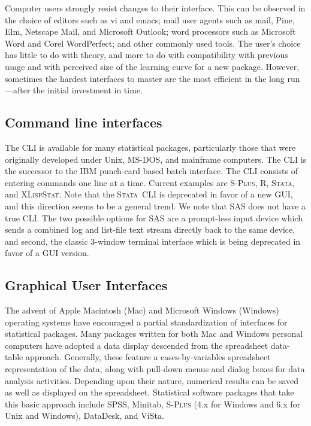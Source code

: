 \documentclass{article}
\newcommand*{\Splus}{\textsc{S-Plus}}
\newcommand*{\XLispStat}{\textsc{XLispStat}}
\newcommand*{\Stata}{\textsc{Stata}}
\begin{document}
Computer users strongly resist changes to their interface.  This can be
observed in the choice of editors such as vi and emacs; mail user agents
such as mail, Pine, Elm, Netscape Mail, and Microsoft Outlook; word
processors such as Microsoft Word and Corel WordPerfect; and other
commonly used tools.  The user's choice has little to do with theory,
and more to do with compatibility with previous usage and with
perceived size of the learning curve for a new package.
However, sometimes the hardest
interfaces to master are the most efficient in the long run---after the
initial investment in time.

\subsection{Command line interfaces}
\label{sec:UI:command}

The CLI is available for many statistical packages, particularly those
that were originally developed under Unix, MS-DOS, and
mainframe computers.  The CLI is the successor to the IBM punch-card
based batch interface.  The CLI consists of entering
commands one line at a time.  Current examples
are \Splus, R, \Stata, and \XLispStat.  Note that
the \Stata\ CLI is deprecated in favor of a new GUI, and this
direction seems to be a general trend.  We note that SAS does not have
a true CLI.  The two possible options for SAS are a prompt-less input
device which sends a combined log and list-file text stream directly
back to the same device, and second, the classic 3-window %
terminal interface which is being deprecated in favor of a GUI
version.

\subsection{Graphical User Interfaces}
\label{sec:UI:GUI}

The advent of Apple Macintosh (Mac) and Microsoft Windows (Windows)
operating systems have encouraged a partial standardization of
interfaces for statistical packages.  Many packages written for both Mac
and Windows personal computers have adopted a data display descended
from the spreadsheet data-table approach.  Generally, these feature a
cases-by-variables spreadsheet representation of the data, along with
pull-down menus and dialog boxes for data analysis activities.
Depending upon their nature, numerical results can be saved as well as
displayed on the spreadsheet.  Statistical software packages that take
this basic approach include SPSS, Minitab, \Splus{} (4.x for Windows and
6.x for Unix and Windows), DataDesk, and ViSta.
\end{document}
